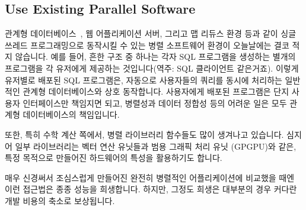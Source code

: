 \subsection{Use Existing Parallel Software}
\label{sec:intro:Use Existing Parallel Software}

관계형 데이터베이스~\cite{Date82}, 웹 어플리케이션 서버, 그리고 맵 리듀스 환경
등과 같이 싱글 쓰레드 프로그래밍으로 동작시킬 수 있는 병렬 소프트웨어 환경이
오늘날에는 결코 적지 않습니다.
예를 들어, 흔한 구조 중 하나는 각자 SQL 프로그램을 생성하는 별개의 프로그램을
각 유저에게 제공하는 것입니다(역주: SQL 클라이언트 같은거죠).
이렇게 유저별로 배포된 SQL 프로그램은, 자동으로 사용자들의 쿼리를 동시에
처리하는 일반적인 관계형 데이터베이스와 상호 동작합니다.
사용자에게 배포된 프로그램은 단지 사용자 인터페이스만 책임지면 되고,
병렬성과 데이터 정합성 등의 어려운 일은 모두 관계형 데이터베이스의 책임입니다.

또한, 특히 수학 계산 쪽에서, 병렬 라이브러리 함수들도 많이 생겨나고 있습니다.
심지어 일부 라이브러리는 벡터 연산 유닛들과 범용 그래픽 처리 유닛 (GPGPU)와
같은, 특정 목적으로 만들어진 하드웨어의 특성을 활용하기도 합니다.

매우 신경써서 조심스럽게 만들어진 완전히 병렬적인 어플리케이션에 비교했을 때엔
이런 접근법은 종종 성능을 희생합니다.
하지만, 그정도 희생은 대부분의 경우 커다란 개발 비용의 축소로 보상됩니다.

